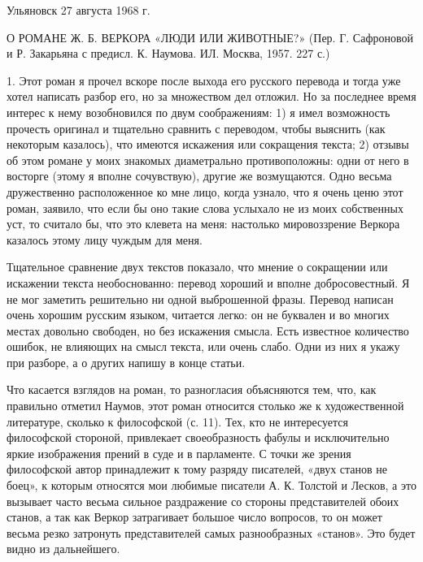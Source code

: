 Ульяновск 27 августа 1968 г.

О РОМАНЕ Ж.  Б. ВЕРКОРА «ЛЮДИ ИЛИ ЖИВОТНЫЕ?» (Пер.  Г. Сафроновой и Р.
Закарьяна с предисл. К. Наумова. ИЛ. Москва, 1957. 227 с.)

1. Этот  роман я прочел  вскоре после  выхода его русского  перевода и
тогда уже хотел написать разбор его,  но за множеством дел отложил. Но
за последнее время  интерес к нему возобновился  по двум соображениям:
1)  я  имел  возможность  прочесть оригинал  и  тщательно  сравнить  с
переводом,  чтобы  выяснить  (как  некоторым  казалось),  что  имеются
искажения  или сокращения  текста; 2)  отзывы  об этом  романе у  моих
знакомых диаметрально противоположны: одни от него в восторге (этому я
вполне сочувствую),  другие же  возмущаются. Одно  весьма дружественно
расположенное ко мне лицо, когда узнало,  что я очень ценю этот роман,
заявило, что если  бы оно такие слова услыхало не  из моих собственных
уст, то считало  бы, что это клевета на  меня: настолько мировоззрение
Веркора казалось этому лицу чуждым для меня.

Тщательное сравнение  двух текстов  показало, что мнение  о сокращении
или  искажении   текста  необоснованно:   перевод  хороший   и  вполне
добросовестный.  Я не  мог  заметить решительно  ни одной  выброшенной
фразы. Перевод  написан очень хорошим русским  языком, читается легко:
он не буквален и во многих  местах довольно свободен, но без искажения
смысла. Есть известное количество ошибок, не влияющих на смысл текста,
или очень слабо. Одни из них я  укажу при разборе, а о других напишу в
конце статьи.

Что касается взглядов  на роман, то разногласия  объясняются тем, что,
как  правильно  отметил Наумов,  этот  роман  относится столько  же  к
художественной литературе, сколько к философской  (с. 11). Тех, кто не
интересуется  философской стороной,  привлекает своеобразность  фабулы
и  исключительно  яркие изображения  прений  в  суде и  в  парламенте.
С  точки  же  зрения  философской автор  принадлежит  к  тому  разряду
писателей,  «двух станов  не боец»,  к которым  относятся мои  любимые
писатели А. К.  Толстой и Лесков, а это вызывает  часто весьма сильное
раздражение со стороны  представителей обоих станов, а  так как Веркор
затрагивает большое число вопросов, то он может весьма резко затронуть
представителей  самых  разнообразных  «станов».  Это  будет  видно  из
дальнейшего.

